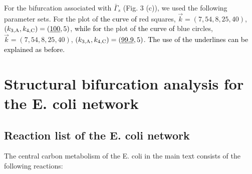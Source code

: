 \documentclass[ amsmath,amssymb,nofootinbib
]{revtex4-1}
\newcommand{\red}[1]{\textcolor{black}{#1}}
\begin{document}
For the bifurcation associated with  ${\bar{\Gamma}_s}$ (Fig. 3 (c)), we used the following parameter sets.
For the plot of \red{the curve of} red squares, $\vec k=(7, 54,8 , 25, 40) $, $(k_{3,{\rm A}}, k_{4,{\rm C}})=(\underline{100},5)$,
\red{while for} the plot of \red{the curve of} blue circles, $\vec k=(7, 54,8 , 25, 40)$,  $(k_{3,{\rm A} }, k_{4,{\rm C}})=(\underline{99.9},5)$.
\red{The use of the underlines can be explained as before.}


\section{{Structural bifurcation analysis for the E. coli network}}

\subsection{Reaction list  of the E. coli network}
The central carbon metabolism  of the E. coli  in the  main text consists of the following reactions:
\end{document}
